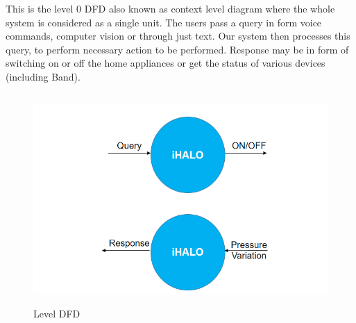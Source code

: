 This is the level 0 DFD also known as context level diagram where the whole system is considered as a single unit. The users pass a query in form voice commands, computer vision or through just text. Our system then processes this query, to perform necessary action to be performed. Response may be in form of switching on or off the home appliances or get the status of various devices (including Band).
\begin{figure}[H]
	
	\centering
	\includegraphics[width=\linewidth,height=8cm] {./images/p3.png}
	\caption{Level DFD}
	\label{manual}
\end{figure}

